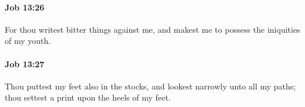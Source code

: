 		\paragraph{Job 13:26} %
			\label{JOB-13-26}

			For thou writest bitter things against me, and makest me to possess the iniquities of my youth.


		\paragraph{Job 13:27} %
			\label{JOB-13-27}

			Thou puttest my feet also in the stocks, and lookest narrowly unto all my paths; thou settest a print upon the heels of my feet.


